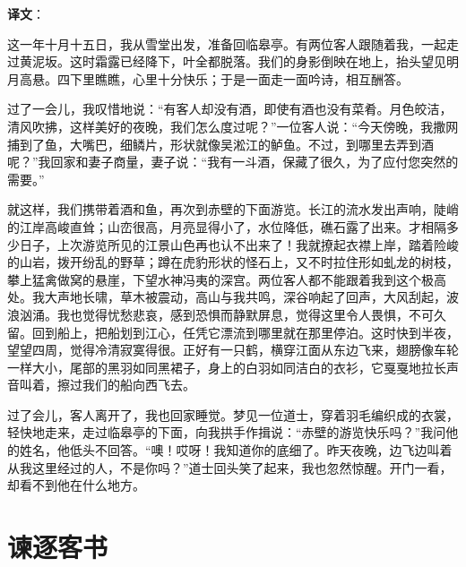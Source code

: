 \documentclass[12pt,UTF-8,openany]{ctexbook}
\begin{document}
\newpage

\textbf{译文}：

\vspace{1em}

\begin{normalsize}
    
    这一年十月十五日，我从雪堂出发，准备回临皋亭。有两位客人跟随着我，一起走过黄泥坂。这时霜露已经降下，叶全都脱落。我们的身影倒映在地上，抬头望见明月高悬。四下里瞧瞧，心里十分快乐；于是一面走一面吟诗，相互酬答。
    
    过了一会儿，我叹惜地说：“有客人却没有酒，即使有酒也没有菜肴。月色皎洁，清风吹拂，这样美好的夜晚，我们怎么度过呢？”一位客人说：“今天傍晚，我撒网捕到了鱼，大嘴巴，细鳞片，形状就像吴淞江的鲈鱼。不过，到哪里去弄到酒呢？”我回家和妻子商量，妻子说：“我有一斗酒，保藏了很久，为了应付您突然的需要。”
    
    就这样，我们携带着酒和鱼，再次到赤壁的下面游览。长江的流水发出声响，陡峭的江岸高峻直耸；山峦很高，月亮显得小了，水位降低，礁石露了出来。才相隔多少日子，上次游览所见的江景山色再也认不出来了！我就撩起衣襟上岸，踏着险峻的山岩，拨开纷乱的野草；蹲在虎豹形状的怪石上，又不时拉住形如虬龙的树枝，攀上猛禽做窝的悬崖，下望水神冯夷的深宫。两位客人都不能跟着我到这个极高处。我大声地长啸，草木被震动，高山与我共鸣，深谷响起了回声，大风刮起，波浪汹涌。我也觉得忧愁悲哀，感到恐惧而静默屏息，觉得这里令人畏惧，不可久留。回到船上，把船划到江心，任凭它漂流到哪里就在那里停泊。这时快到半夜，望望四周，觉得冷清寂寞得很。正好有一只鹤，横穿江面从东边飞来，翅膀像车轮一样大小，尾部的黑羽如同黑裙子，身上的白羽如同洁白的衣衫，它戛戛地拉长声音叫着，擦过我们的船向西飞去。
    
    过了会儿，客人离开了，我也回家睡觉。梦见一位道士，穿着羽毛编织成的衣裳，轻快地走来，走过临皋亭的下面，向我拱手作揖说：“赤壁的游览快乐吗？”我问他的姓名，他低头不回答。“噢！哎呀！我知道你的底细了。昨天夜晚，边飞边叫着从我这里经过的人，不是你吗？”道士回头笑了起来，我也忽然惊醒。开门一看，却看不到他在什么地方。
    
\end{normalsize}



\chapter{谏逐客书}
\end{document}

